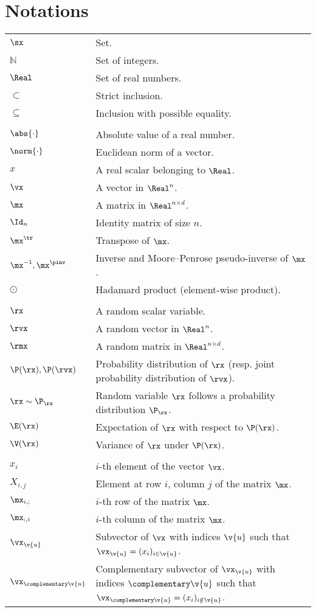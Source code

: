 \section*{Notations}
\label{notations}

\renewcommand{\arraystretch}{1.2}
\begin{tabular}{p{2.0cm}|p{15cm}}
$\sx$ & Set. \\
$\mathbb{N}$ & Set of integers. \\
$\Real$ & Set of real numbers. \\
$\subset$ & Strict inclusion. \\
$\subseteq$ & Inclusion with possible equality. \\

\\
$\abs{\cdot}$ & Absolute value of a real number. \\
$\norm{\cdot}$ & Euclidean norm of a vector. \\
$x$ & A real scalar belonging to $\Real$. \\
$\vx$ & A vector in $\Real^n$. \\
$\mx$ & A matrix in $\Real^{n \times d}$. \\
$\Id_n$ & Identity matrix of size $n$. \\
$\mx^\tr$ & Transpose of $\mx$. \\
$\mx^{-1}, \mx^\pinv$ & Inverse and Moore–Penrose pseudo-inverse of $\mx$. \\
$\odot$ & Hadamard product (element-wise product). \\

\\
$\rx$ & A random scalar variable. \\
$\rvx$ & A random vector in $\Real^n$. \\
$\rmx$ & A random matrix in $\Real^{n \times d}$. \\
$\P(\rx), \P(\rvx)$ & Probability distribution of $\rx$ (resp. joint probability distribution of $\rvx$). \\
$\rx \sim \P_{\rx}$ & Random variable $\rx$ follows a probability distribution $\P_{\rx}$. \\
$\E(\rx)$ & Expectation of $\rx$ with respect to $\P(\rx)$. \\
$\V(\rx)$ & Variance of $\rx$ under $\P(\rx)$. \\

\\
$x_i$ & $i$-th element of the vector $\vx$. \\
$X_{i,j}$ & Element at row $i$, column $j$ of the matrix $\mx$. \\
$\mx_{i, :}$ & $i$-th row of the matrix $\mx$. \\
$\mx_{:, i}$ & $i$-th column of the matrix $\mx$. \\
$\vx_{\v{u}}$ & Subvector of $\vx$ with indices $\v{u}$ such that $\vx_{\v{u}} = (x_i)_{i \in \v{u}}$. \\
$\vx_{\complementary\v{u}}$ & Complementary subvector of $\vx_{\v{u}}$ with indices $\complementary\v{u}$ such that $\vx_{\complementary\v{u}} = (x_i)_{i \notin \v{u}}$. \\


\end{tabular}
